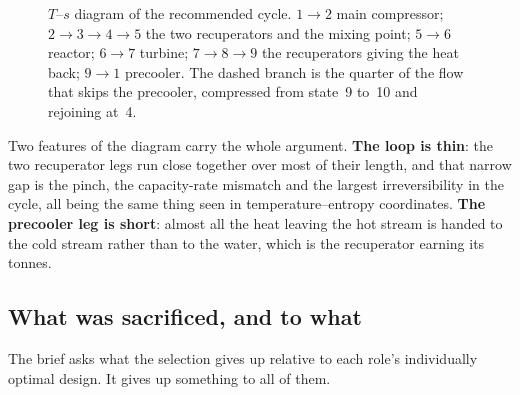 \begin{figure}[htbp]
\centering
{}
\caption{$T$--$s$ diagram of the recommended cycle. $1\to2$ main
compressor; $2\to3\to4\to5$ the two recuperators and the mixing point;
$5\to6$ reactor; $6\to7$ turbine; $7\to8\to9$ the recuperators giving
the heat back; $9\to1$ precooler. The dashed branch is the quarter of
the flow that skips the precooler, compressed from state~9 to~10 and
rejoining at~4.}
\label{r:fig:ts}
\end{figure}

Two features of the diagram carry the whole argument. \textbf{The loop
is thin}: the two recuperator legs run close together over most of
their length, and that narrow gap is the pinch, the capacity-rate
mismatch and the largest irreversibility in the cycle, all being the
same thing seen in temperature--entropy coordinates. \textbf{The
precooler leg is short}: almost all the heat leaving the hot stream is
handed to the cold stream rather than to the water, which is the
recuperator earning its tonnes.

\subsection{What was sacrificed, and to what}

The brief asks what the selection gives up relative to each role's
individually optimal design. It gives up something to all of them.

